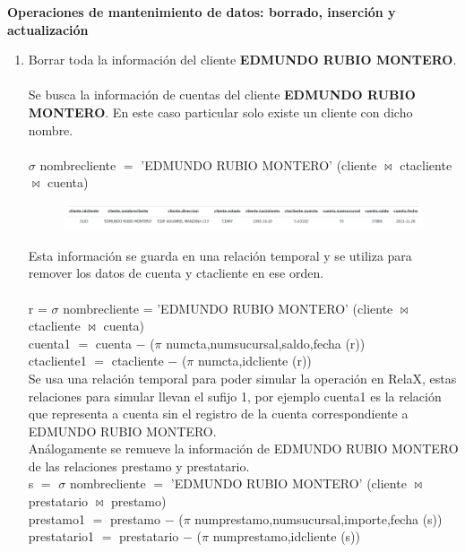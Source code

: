 \documentclass{exam}
\begin{document}
\begin{questions}
\begin{enumerate}[label=\alph*.]
	\end{enumerate}
	
	
	\newpage
	\textbf{Operaciones de mantenimiento de datos: borrado, inserción y actualización}
	\begin{enumerate}[label=\alph*.]
		\item Borrar toda la información del cliente \textbf{EDMUNDO RUBIO MONTERO}.\\\\
		Se busca la información de cuentas del cliente \textbf{EDMUNDO RUBIO MONTERO}. En este caso particular solo existe un cliente con dicho nombre.\\\\
		$\sigma$ nombrecliente $=$ 'EDMUNDO RUBIO MONTERO' (cliente $\bowtie$ ctacliente $\bowtie$ cuenta)
		\begin{center}
		\begin{figure}[h!]
			\includegraphics[width=17cm]{imgs/a1.png}
			\centering
		\end{figure}	
		\end{center}
		Esta información se guarda en una relación temporal y se utiliza para remover los datos de cuenta y ctacliente en ese orden.\\\\
		r = $\sigma$ nombrecliente = 'EDMUNDO RUBIO MONTERO' (cliente $\bowtie$ ctacliente $\bowtie$ cuenta)\\
cuenta1 $=$ cuenta $-$ ($\pi$ numcta,numsucursal,saldo,fecha (r))\\
ctacliente1 $=$ ctacliente $-$ ($\pi$ numcta,idcliente (r))\\

		Se usa una relación temporal para poder simular la operación en RelaX, estas relaciones para simular llevan el sufijo 1, por ejemplo cuenta1 es la relación que representa a cuenta sin el registro de la cuenta correspondiente a EDMUNDO RUBIO MONTERO.\\
		
		Análogamente se remueve la información de EDMUNDO RUBIO MONTERO de las relaciones prestamo y prestatario.\\
		
		s $=$ $\sigma$ nombrecliente $=$ 'EDMUNDO RUBIO MONTERO' (cliente $\bowtie$ prestatario $\bowtie$ prestamo)\\
prestamo1 $=$ prestamo $-$ ($\pi$ numprestamo,numsucursal,importe,fecha (s))\\
prestatario1 $=$ prestatario $-$ ($\pi$ numprestamo,idcliente (s))\\


\end{enumerate}
\end{questions}
\end{document}
